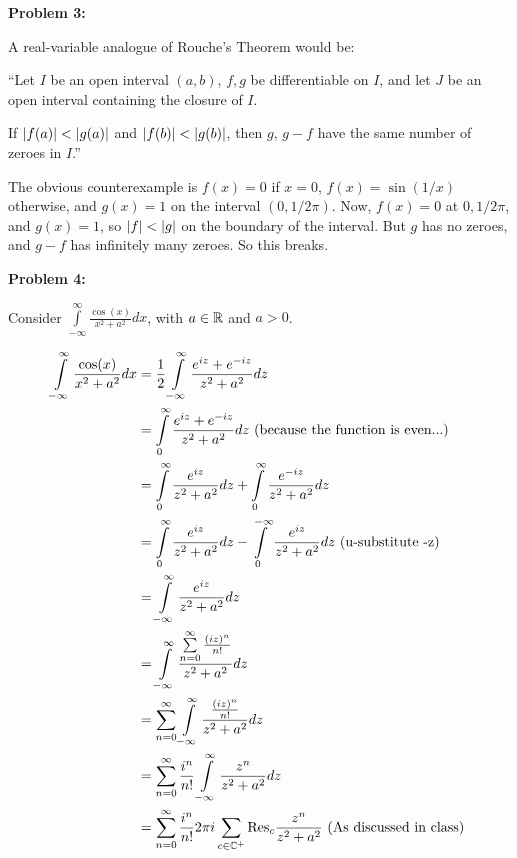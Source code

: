 \documentclass[a4paper,12pt]{article}
\begin{document}
\shunt

{\bf Problem 3:}

A real-variable analogue of Rouche's Theorem would be:

``Let $I$ be an open interval $(a,b)$, $f,g$ be differentiable on $I$, and let $J$ be an open interval containing the closure of $I$.

If $\left\lvert f(a) \right\rvert < \left\lvert g(a) \right\rvert$ and $\left\lvert f(b) \right\rvert < \left\lvert g(b) \right\rvert$, then $g$, $g-f$ have the same number of zeroes in $I$.''

The obvious counterexample is $f(x) = 0$ if $x = 0$, $f(x) = \sin(1/x)$ otherwise, and $g(x) =1$ on the interval $(0,1/2\pi)$. Now, $f(x) = 0$ at $0,1/2\pi$, and $g(x) =1$, so $\left\lvert f \right\rvert < \left\lvert g \right\rvert$ on the boundary of the interval. But $g$ has no zeroes, and $g-f$ has infinitely many zeroes. So this breaks.

\shunt

{\bf Problem 4:}

Consider $\int\limits_{-\infty}^\infty \frac{\cos(x)}{x^2+a^2} dx$, with $a \in \mathbb{R}$ and $a > 0$.

\begin{align*}
\int\limits_{-\infty}^\infty \frac{\cos(x)}{x^2+a^2} dx &= \frac{1}{2} \int\limits_{-\infty}^\infty \frac{e^{iz}+e^{-iz}}{z^2+a^2}dz\\
&=\int\limits_{0}^\infty \frac{e^{iz}+e^{-iz}}{z^2+a^2}dz \text{ (because the function is even...)}\\
&= \int\limits_{0}^\infty \frac{e^{iz}}{z^2+a^2}dz + \int\limits_{0}^\infty \frac{e^{-iz}}{z^2+a^2}dz\\
&= \int\limits_{0}^\infty \frac{e^{iz}}{z^2+a^2}dz - \int\limits_{0}^{-\infty} \frac{e^{iz}}{z^2+a^2}dz \text{ (u-substitute -z)} \\
&= \int\limits_{-\infty}^\infty \frac{e^{iz}}{z^2+a^2}dz \\
&= \int\limits_{-\infty}^\infty \frac{\sum\limits_{n=0}^\infty \frac{(iz)^n}{n!}}{z^2+a^2}dz \\
&= \sum\limits_{n=0}^\infty \int\limits_{-\infty}^\infty \frac{\frac{(iz)^n}{n!}}{z^2+a^2}dz \\
&= \sum\limits_{n=0}^\infty \frac{i^n}{n!} \int\limits_{-\infty}^\infty \frac{z^n}{z^2+a^2}dz \\
&= \sum\limits_{n=0}^\infty \frac{i^n}{n!} 2\pi i \sum\limits_{c \in \mathbb{C}^+} \text{Res}_c \frac{z^n}{z^2+a^2} \text{ (As discussed in class) } \\
\end{align*} %
\end{document}
